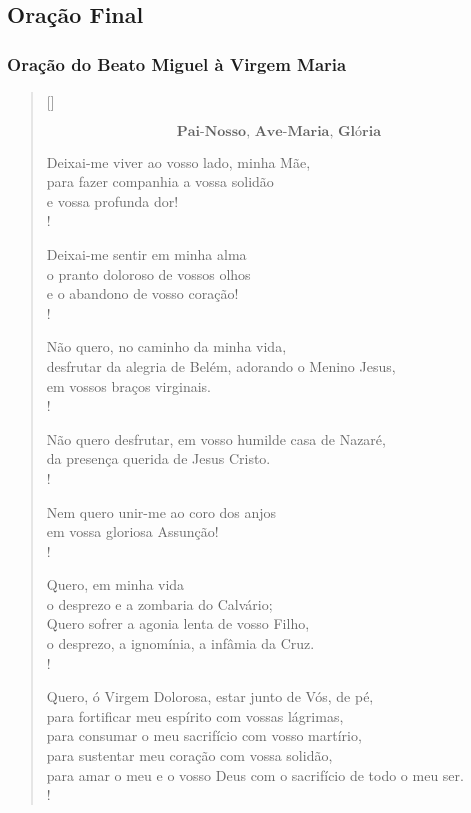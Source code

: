 \documentclass[a4paper,14pt,twoside]{extarticle} \usepackage[utf8]{inputenc}
\begin{document}
\subsection{Oração Final}\label{sub:Oração Final} %

\subsubsection{Oração do Beato Miguel à Virgem Maria}

\settowidth{\versewidth}{para amar o meu e o vosso Deus com o sacrifício de todo o meu ser.\\!}
\begin{verse}[\versewidth]

\[\textbf{Pai-Nosso, Ave-Maria, Glória}\]

Deixai-me viver ao vosso lado, minha Mãe,\\
para fazer companhia a vossa solidão\\
e vossa profunda dor!\\!

Deixai-me sentir em minha alma\\
o pranto doloroso de vossos olhos\\
e o abandono de vosso coração!\\!

Não quero, no caminho da minha vida,\\
desfrutar da alegria de Belém, adorando o Menino Jesus,\\
em vossos braços virginais.\\!

Não quero desfrutar, em vosso humilde casa de Nazaré,\\
da presença querida de Jesus Cristo.\\!

Nem quero unir-me ao coro dos anjos\\
em vossa gloriosa Assunção!\\!

Quero, em minha vida\\
o desprezo e a zombaria do Calvário;\\
Quero sofrer a agonia lenta de vosso Filho,\\
o desprezo, a ignomínia, a infâmia da Cruz.\\!

Quero, ó Virgem Dolorosa, estar junto de Vós, de pé,\\
para fortificar meu espírito com vossas lágrimas,\\
para consumar o meu sacrifício com vosso martírio,\\
para sustentar meu coração com vossa solidão,\\
para amar o meu e o vosso Deus com o sacrifício de todo o meu ser.\\!

\end{verse}
\end{document}
